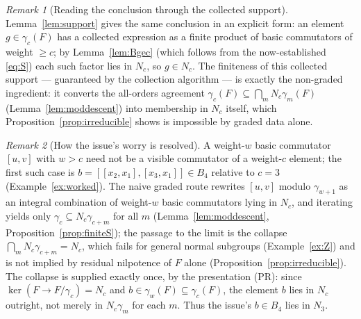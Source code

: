 \documentclass{amsart}
\theoremstyle{definition}
\theoremstyle{remark}
\newtheorem{remark}{Remark}
\begin{document}
\begin{remark}[Reading the conclusion through the collected support]\label{rem:support-read}
Lemma~\ref{lem:support} gives the same conclusion in an explicit form: an element
$g\in\gamma_c(F)$ has a collected expression as a finite product of basic commutators of weight
$\ge c$; by Lemma~\ref{lem:Bgec} (which follows from the now-established \eqref{eq:S}) each such
factor lies in $N_c$, so $g\in N_c$. The finiteness of this collected support --- guaranteed by
the collection algorithm --- is exactly the non-graded ingredient: it converts the
all-orders agreement $\gamma_c(F)\subseteq\bigcap_m N_c\gamma_m(F)$ (Lemma~\ref{lem:moddescent})
into membership in $N_c$ itself, which Proposition~\ref{prop:irreducible} shows is impossible by
graded data alone.
\end{remark}

\begin{remark}[How the issue's worry is resolved]\label{rem:issue}
A weight-$w$ basic commutator $[u,v]$ with $w>c$ need not be a visible commutator of a
weight-$c$ element; the first such case is $b=[[x_2,x_1],[x_3,x_1]]\in B_4$ relative to
$c=3$ (Example~\ref{ex:worked}). The naive graded route rewrites $[u,v]$ modulo
$\gamma_{w+1}$ as an integral combination of weight-$w$ basic commutators lying in $N_c$, and
iterating yields only $\gamma_c\subseteq N_c\gamma_{c+m}$ for all $m$
(Lemma~\ref{lem:moddescent}, Proposition~\ref{prop:finiteS}); the passage to the limit is the
collapse $\bigcap_m N_c\gamma_{c+m}=N_c$, which fails for general normal subgroups
(Example~\ref{ex:Z}) and is not implied by residual nilpotence of $F$ alone
(Proposition~\ref{prop:irreducible}). The collapse is supplied exactly once, by the
presentation (PR): since $\ker(F\to F/\gamma_c)=N_c$ and $b\in\gamma_w(F)\subseteq\gamma_c(F)$,
the element $b$ lies in $N_c$ outright, not merely in $N_c\gamma_m$ for each $m$. Thus the
issue's $b\in B_4$ lies in $N_3$.
\end{remark}
\end{document}
